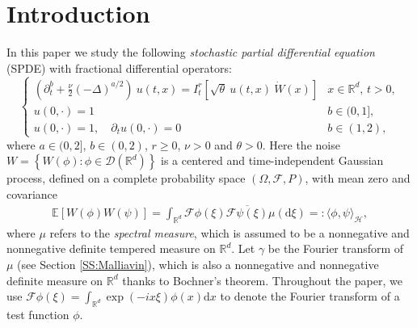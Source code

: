\documentclass[a4paper,11pt]{article}
\numberwithin{equation}{section}
\numberwithin{equation}{section}
\theoremstyle{plain}
\theoremstyle{definition}
\newcommand{\ud}{\ensuremath{\mathrm{d} }}
\newcommand{\R}{\mathbb{R}}
\begin{document}
\section{Introduction}
In this paper we study the following {\it stochastic partial differential equation} (SPDE) with
fractional differential operators:
\begin{equation} \label{E:SPDE}
  \begin{cases}
    \left(\partial^b_t + \frac{\nu}{2}(-\Delta)^{a/2}\right)\: u(t,x) = I^r_t \left[\sqrt{\theta}\: u(t,x)\: \dot W(x) \right] & \text{$x\in \R^d$, $t>0$}, \\
    u(0,\cdot) = 1                                                                                                             & b \in (0,1],               \\
    u(0,\cdot) = 1, \quad \partial_t u(0,\cdot) = 0                                                                            & b \in (1,2),
  \end{cases}
\end{equation}
where $a \in (0,2]$, $b \in (0,2)$, $r\ge 0$, $\nu > 0$ and $\theta>0$. Here the noise $W = \left\{
W(\phi) : \phi \in \mathcal{D}(\R^d) \right\}$ is a centered and time-independent Gaussian process,
defined on a complete probability space $(\Omega, \mathcal{F}, P)$, with mean zero and covariance
\begin{align*}
    \mathbb{E}\left[ W(\phi) W(\psi) \right] = \int_{\R^d} \mathcal{F}\phi(\xi)\overline{\mathcal{F}\psi(\xi)} \mu(\ud \xi) =: \langle \phi, \psi \rangle_{\mathcal{H}},
\end{align*}
where $\mu$ refers to the {\it spectral measure}, which is assumed to be a nonnegative and
nonnegative definite tempered measure on $\R^d$. Let $\gamma$ be the Fourier transform of $\mu$ (see
Section \ref{SS:Malliavin}), which is also a nonnegative and nonnegative definite measure on $\R^d$
thanks to Bochner's theorem. Throughout the paper, we use $\mathcal{F}\phi(\xi) = \int_{\R^d}
\exp(-ix \xi) \phi(x) \ud x$ to denote the Fourier transform of a test function $\phi$.
\end{document}
